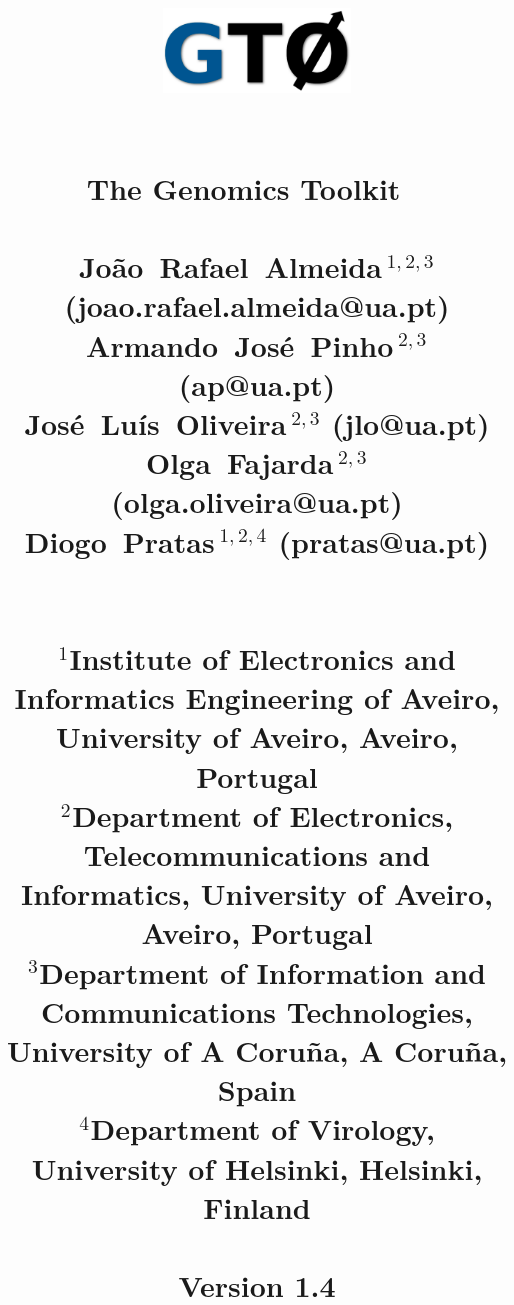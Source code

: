 \documentclass[11pt,journal,compsoc]{report}[1]
\begin{document}
\title{
%
\begin{figure}[h!]
\centerline{\includegraphics[width=5cm]{../imgs/logo.pdf}}
\label{logo}
\end{figure}
~\\
\textbf{The Genomics Toolkit}
~\\~\\
\large
Jo\~ao~Rafael~Almeida\,$^{1,2,3}$ (joao.rafael.almeida@ua.pt)\\
Armando~Jos\'e~Pinho\,$^{2,3}$ (ap@ua.pt)\\
Jos\'e~Lu\'is~Oliveira\,$^{2,3}$ (jlo@ua.pt)\\
Olga~Fajarda\,$^{2,3}$ (olga.oliveira@ua.pt)\\
Diogo~Pratas\,$^{1,2,4}$ (pratas@ua.pt)\\
~\\~\\
\small
$^1$Institute of Electronics and Informatics Engineering of Aveiro, University of Aveiro, Aveiro, Portugal\\
$^2$Department of Electronics, Telecommunications and Informatics, University of Aveiro, Aveiro, Portugal\\
$^3$Department of Information and Communications Technologies, University of A Coru\~na, A Coru\~na, Spain\\
$^4$Department of Virology, University of Helsinki, Helsinki, Finland\\
~\\
Version 1.4
}
\date{}
\maketitle

\tableofcontents

\def \AminoAcidSequenceToolsPath {sections/Amino_acid_sequence_tools}
\def \FASTQToolsPath {sections/FASTQ_tools}
\def \FASTAToolsPath {sections/FASTA_tools}
\def \GenomicSequenceToolsPath {sections/Genomic_sequence_tools}
\def \GeneralPurposeToolsPath {sections/General_purpose_tools}












\end{document}
